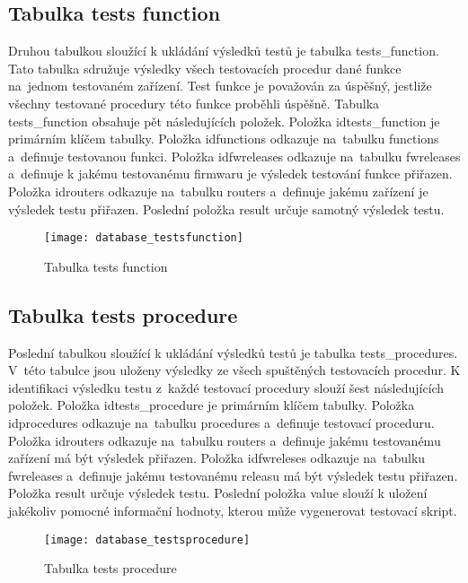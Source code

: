 \subsection{Tabulka tests function}
Druhou tabulkou sloužící k ukládání výsledků testů je tabulka tests\_function. Tato tabulka sdružuje výsledky všech testovacích procedur dané funkce na~jednom testovaném zařízení. Test funkce je považován za úspěšný, jestliže všechny testované procedury této funkce proběhli úspěšně. Tabulka tests\_function obsahuje pět následujících položek. Položka idtests\_function je primárním klíčem tabulky. Položka idfunctions odkazuje na~tabulku functions a~definuje testovanou funkci. Položka idfwreleases odkazuje na~tabulku fwreleases a~definuje k jakému testovanému firmwaru je výsledek testování funkce přiřazen. Položka idrouters odkazuje na~tabulku routers a~definuje jakému zařízení je výsledek testu přiřazen. Poslední položka result určuje samotný výsledek testu.

\begin{figure}[h]
  \centering
  \texttt{[image: database\_testsfunction]}
  \caption{Tabulka tests function}
  \label{fig:database_testsfunction}
\end{figure}

\subsection{Tabulka tests procedure}
Poslední tabulkou sloužící k ukládání výsledků testů je tabulka tests\_procedures. V~této tabulce jsou uloženy výsledky ze všech spuštěných testovacích procedur. K identifikaci výsledku testu z~každé testovací procedury slouží šest následujících položek. Položka idtests\_procedure je primárním klíčem tabulky. Položka idprocedures odkazuje na~tabulku procedures a~definuje testovací proceduru. Položka idrouters odkazuje na~tabulku routers a~definuje jakému testovanému zařízení má být výsledek přiřazen. Položka idfwreleses odkazuje na~tabulku fwreleases a~definuje jakému testovanému releasu má být výsledek testu přiřazen. Položka result určuje výsledek testu. Poslední položka value slouží k uložení jakékoliv pomocné informační hodnoty, kterou může vygenerovat testovací skript.

\begin{figure}[h]
  \centering
  \texttt{[image: database\_testsprocedure]}
  \caption{Tabulka tests procedure}
  \label{fig:database_testsprocedure}
\end{figure}

